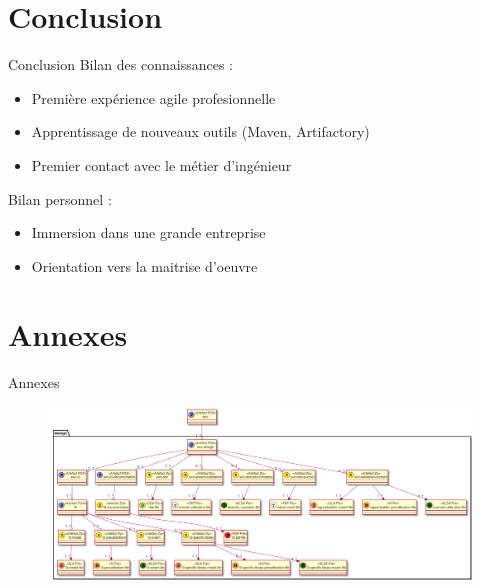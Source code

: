 \documentclass{bredelebeamer}
\begin{document}
\section{Conclusion}
\begin{frame}{Conclusion}
	Bilan des connaissances :
	\begin{itemize}
		\bigskip
		\item Première expérience agile profesionnelle
		\bigskip
		\item Apprentissage de nouveaux outils (Maven, Artifactory)
		\bigskip
		\item Premier contact avec le métier d'ingénieur
	\end{itemize}
		\bigskip
		Bilan personnel :
	\begin{itemize}
		\bigskip
		\item Immersion dans une grande entreprise
		\bigskip
		\item Orientation vers la maitrise d'oeuvre
	\end{itemize}
\end{frame}

\section{Annexes}
\begin{frame}{Annexes}
	\begin{figure}
		\includegraphics[scale=0.3]{images/livrables.png}
	\end{figure}
\end{frame}
\end{document}

